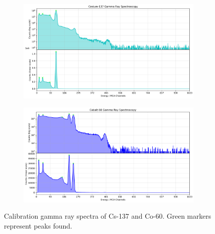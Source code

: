 \documentclass[12pt]{article}
\begin{document}
\begin{figure}[H]
    \centering
    \begin{subfigure}{0.98\linewidth}
        \centering
        \includegraphics[width=0.98\linewidth]{figs/fig7a.png}
    \end{subfigure}
    \begin{subfigure}{0.98\linewidth}
        \centering
        \includegraphics[width=0.98\linewidth]{figs/fig7b.png}
    \end{subfigure}
    \caption{
        Calibration gamma ray spectra of Cs-137 and Co-60. Green markers represent peaks found.
    }
\end{figure}
\end{document}
